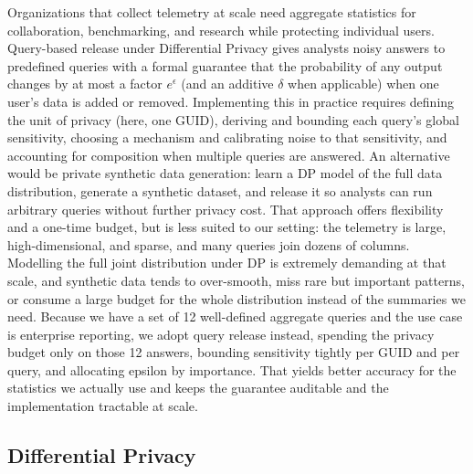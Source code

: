 \documentclass[12pt,letterpaper]{article}
\begin{document}
Organizations that collect telemetry at scale need aggregate statistics for collaboration, benchmarking, and research while protecting individual users. Query-based release under Differential Privacy gives analysts noisy answers to predefined queries with a formal guarantee that the probability of any output changes by at most a factor $e^\epsilon$ (and an additive $\delta$ when applicable) when one user's data is added or removed. Implementing this in practice requires defining the unit of privacy (here, one GUID), deriving and bounding each query's global sensitivity, choosing a mechanism and calibrating noise to that sensitivity, and accounting for composition when multiple queries are answered. An alternative would be private synthetic data generation: learn a DP model of the full data distribution, generate a synthetic dataset, and release it so analysts can run arbitrary queries without further privacy cost. That approach offers flexibility and a one-time budget, but is less suited to our setting: the telemetry is large, high-dimensional, and sparse, and many queries join dozens of columns. Modelling the full joint distribution under DP is extremely demanding at that scale, and synthetic data tends to over-smooth, miss rare but important patterns, or consume a large budget for the whole distribution instead of the summaries we need. Because we have a set of 12 well-defined aggregate queries and the use case is enterprise reporting, we adopt query release instead, spending the privacy budget only on those 12 answers, bounding sensitivity tightly per GUID and per query, and allocating epsilon by importance. That yields better accuracy for the statistics we actually use and keeps the guarantee auditable and the implementation tractable at scale.

\subsection{Differential Privacy}
\label{sec:dp_definitions}
\end{document}
